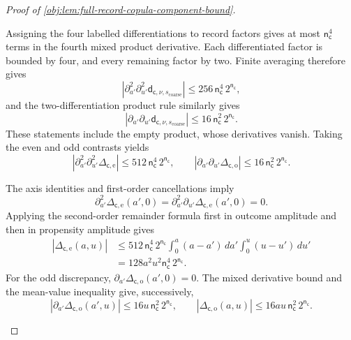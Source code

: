 \documentclass[11pt]{article}
\begin{document}
\begin{proof}[Proof of \cref{obj:lem:full-record-copula-component-bound}]
\begin{enumerate}
Assigning the four labelled differentiations to record factors gives at most
\(\mathsf n_{\mathsf c}^4\) terms in the fourth mixed product derivative. Each differentiated factor is bounded by four, and every remaining factor by two. Finite averaging therefore gives
\[
\left|
\partial_{a'}^2\partial_{u'}^2
 \mathsf d_{\mathsf c,\nu,s_{\mathrm{coarse}}}
\right|
 \le256\,\mathsf n_{\mathsf c}^4\,2^{\mathsf n_{\mathsf c}},
\]
and the two-differentiation product rule similarly gives
\[
\left|
\partial_{a'}\partial_{u'}
 \mathsf d_{\mathsf c,\nu,s_{\mathrm{coarse}}}
\right|
 \le16\,\mathsf n_{\mathsf c}^2\,2^{\mathsf n_{\mathsf c}}.
\]
These statements include the empty product, whose derivatives vanish. Taking the even and odd contrasts yields
\[
\left|
\partial_{a'}^2\partial_{u'}^2
 \Delta_{\mathsf c,\mathrm e}
\right|
 \le512\,\mathsf n_{\mathsf c}^4\,2^{\mathsf n_{\mathsf c}},
\qquad
\left|
\partial_{a'}\partial_{u'}
 \Delta_{\mathsf c,\mathrm o}
\right|
 \le16\,\mathsf n_{\mathsf c}^2\,2^{\mathsf n_{\mathsf c}}.
\]

The axis identities and first-order cancellations imply
\[
\partial_{a'}^2\Delta_{\mathsf c,\mathrm e}(a',0)
 =
\partial_{a'}^2\partial_{u'}
 \Delta_{\mathsf c,\mathrm e}(a',0)=0.
\]
Applying the second-order remainder formula first in outcome amplitude and then in propensity amplitude gives
\[
\begin{aligned}
|\Delta_{\mathsf c,\mathrm e}(a,u)|
&\le
512\,\mathsf n_{\mathsf c}^4\,2^{\mathsf n_{\mathsf c}}
 \int_0^a(a-a')\,da'
 \int_0^u(u-u')\,du'\\
&=
128a^2u^2\mathsf n_{\mathsf c}^4\,2^{\mathsf n_{\mathsf c}}.
\end{aligned}
\]
For the odd discrepancy,
\(\partial_{a'}\Delta_{\mathsf c,\mathrm o}(a',0)=0\).
The mixed derivative bound and the mean-value inequality give, successively,
\[
|\partial_{a'}\Delta_{\mathsf c,\mathrm o}(a',u)|
 \le16u\,\mathsf n_{\mathsf c}^2\,2^{\mathsf n_{\mathsf c}},
\qquad
|\Delta_{\mathsf c,\mathrm o}(a,u)|
 \le16au\,\mathsf n_{\mathsf c}^2\,2^{\mathsf n_{\mathsf c}}.
\]


\end{enumerate}
\end{proof}
\end{document}
